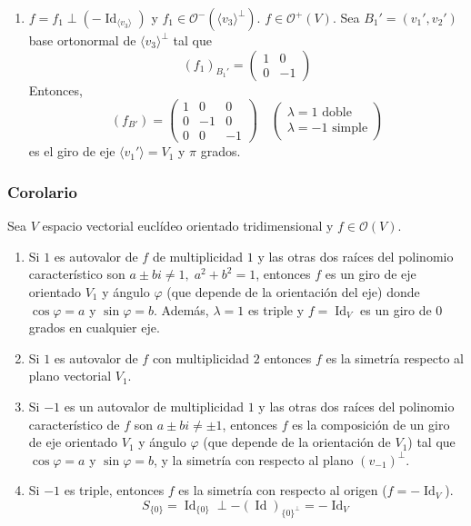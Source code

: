 \documentclass[12pt, a4paper, ones, notitlepage, openany,titlepage]{article}
\begin{document}
\begin{enumerate}[label=(\arabic*)]
	\item $f = f_1 \perp (-\operatorname{Id}_{\langle v_3 \rangle})$ y $f_1 \in \mathcal{O}^-(\langle v_3 \rangle^\perp)$. $f \in \mathcal{O}^+(V)$. Sea $B_1' = (v_1',v_2')$ base ortonormal de $\langle v_3 \rangle^\perp$ tal que 
	$$
	\left(f_1\right)_{B_1'} = \begin{pmatrix}
		1 & 0 \\
		0 & -1
	\end{pmatrix}
	$$
	Entonces,
	$$
	\left(f_{B'}\right) = \begin{pmatrix}
		1 & 0 & 0 \\
		0 & -1 & 0 \\
		0 & 0 & -1
	\end{pmatrix} \quad \begin{pmatrix}
		\lambda = 1 \text{ doble} \\
		\lambda = -1 \text{ simple}
	\end{pmatrix}
	$$
	es el giro de eje $\langle v_1' \rangle = V_1$ y $\pi$ grados.
\end{enumerate}

\subsubsection{Corolario}
Sea $V$ espacio vectorial euclídeo orientado tridimensional y $f \in \mathcal{O}(V)$.
\begin{enumerate}[label=(\arabic*)]
	\item Si $1$ es autovalor de $f$ de multiplicidad $1$ y las otras dos raíces del polinomio característico son $a \pm bi \neq 1, \; a^2 + b^2 = 1$, entonces $f$ es un giro de eje orientado $V_1$ y ángulo $\varphi$ (que depende de la orientación del eje) donde $\cos \varphi = a$ y $\sin \varphi = b$. Además, $\lambda = 1$ es triple y $f = \operatorname{Id}_V$ es un giro de $0$ grados en cualquier eje.
	
	\item Si $1$ es autovalor de $f$ con multiplicidad $2$ entonces $f$ es la simetría respecto al plano vectorial $V_1$.
	
	\item Si $-1$ es un autovalor de multiplicidad $1$ y las otras dos raíces del polinomio característico de $f$ son $a \pm bi \neq \pm 1$, entonces $f$ es la composición de un giro de eje orientado $V_1$ y ángulo $\varphi$ (que depende de la orientación de $V_1$) tal que $\cos \varphi = a$ y $\sin \varphi = b$, y la simetría con respecto al plano $(v_{-1})^\perp$.
	
	\item Si $-1$ es triple, entonces $f$ es la simetría con respecto al origen ($f = -\operatorname{Id}_V$).
	$$
	S_{\{0\}} = \operatorname{Id}_{\{0\}} \perp -(\operatorname{Id})_{\{0\}^\perp} = -\operatorname{Id}_V
	$$
\end{enumerate}
\end{document}
